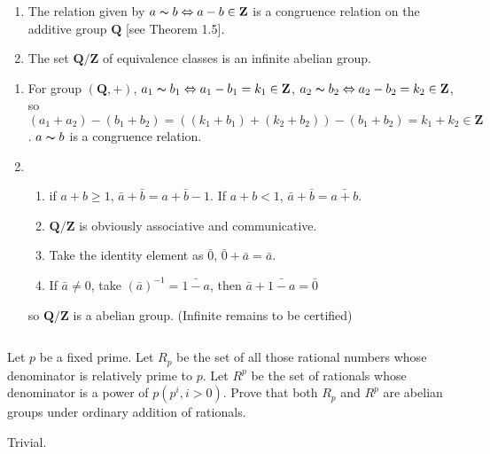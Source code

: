$$ $$

\begin{ex}
    \begin{enumerate}
        \item The relation given by $a \thicksim b \Leftrightarrow a - b \in \mathbf{Z}$ is a congruence relation on the additive group $\mathbf{Q}$ [see Theorem 1.5].
        \item The set $\mathbf{Q}/\mathbf{Z}$ of equivalence classes is an infinite abelian group.
    \end{enumerate}
\end{ex}

\begin{answer}
    \begin{enumerate}
        \item For group $(\mathbf{Q}, +)$, $a_1\thicksim b_1\Leftrightarrow a_1-b_1=k_1\in \mathbf{Z}$, $a_2\thicksim b_2\Leftrightarrow a_2-b_2=k_2\in \mathbf{Z}$, so $(a_1+a_2)-(b_1+b_2)=((k_1+b_1)+(k_2+b_2))-(b_1+b_2)=k_1+k_2\in\mathbf{Z}$. $a\thicksim b$ is a congruence relation.
        \item \begin{enumerate}[1]
            \item if $a+b\geq 1$, $\bar{a}+\bar{b}=\bar{a+b-1}$. If $a+b<1$, $\bar{a}+\bar{b}=\bar{a+b}$.
            \item $\mathbf{Q}/\mathbf{Z}$ is obviously associative and communicative.
            \item Take the identity element as $\bar{0}$, $\bar{0}+\bar{a}=\bar{a}$.
            \item If $\bar{a}\neq 0$, take $(\bar{a})^{-1}=\bar{1-a}$, then $\bar{a}+\bar{1-a}=\bar{0}$
        \end{enumerate}
        so $\mathbf{Q}/\mathbf{Z}$ is a abelian group. (Infinite remains to be certified)
    \end{enumerate}
\end{answer}

$$ $$

\begin{ex}
    Let $p$ be a fixed prime. Let $R_p$ be the set of all those rational numbers whose denominator is relatively prime to $p$. Let $R^p$ be the set of rationals whose denominator is a power of $p (p^i, i > 0)$. Prove that both $R_p$ and $R^p$ are abelian groups under ordinary addition of rationals.
\end{ex}

\begin{answer}
    Trivial.
\end{answer}

